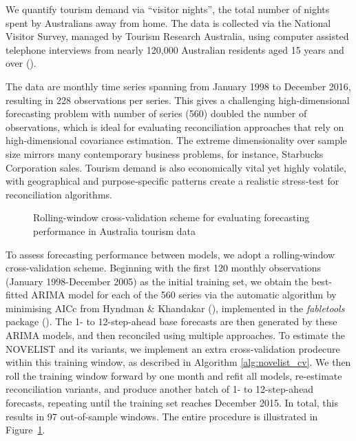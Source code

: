 \documentclass[
  11pt,
  letterpaper,
  DIV=11,
  numbers=noendperiod,
  titlepage]{scrartcl}
\begin{document}
We quantify tourism demand via ``visitor nights'', the total number of
nights spent by Australians away from home. The data is collected via
the National Visitor Survey, managed by Tourism Research Australia,
using computer assisted telephone interviews from nearly 120,000
Australian residents aged 15 years and over
().

The data are monthly time series spanning from January 1998 to December
2016, resulting in 228 observations per series. This gives a challenging
high-dimensional forecasting problem with number of series (560) doubled
the number of observations, which is ideal for evaluating reconciliation
approaches that rely on high-dimensional covariance estimation. The
extreme dimensionality over sample size mirrors many contemporary
business problems, for instance, Starbucks Corporation sales. Tourism
demand is also economically vital yet highly volatile, with geographical
and purpose‑specific patterns create a realistic stress‑test for
reconciliation algorithms.

\begin{figure}


\caption{\label{fig-tourism-cv}Rolling-window cross-validation scheme
for evaluating forecasting performance in Australia tourism data}

\end{figure}%

To assess forecasting performance between models, we adopt a
rolling-window cross-validation scheme. Beginning with the first 120
monthly observations (January 1998-December 2005) as the initial
training set, we obtain the best-fitted ARIMA model for each of the 560
series via the automatic algorithm by minimising AICc from Hyndman \&
Khandakar (), implemented in the
\emph{fabletools} package (). The 1- to 12-step-ahead base forecasts are then
generated by these ARIMA models, and then reconciled using multiple
approaches. To estimate the NOVELIST and its variants, we implement an
extra cross-validation prodecure within this training window, as
described in Algorithm \ref{alg:novelist_cv}. We then roll the training
window forward by one month and refit all models, re-estimate
reconciliation variants, and produce another batch of 1- to
12-step-ahead forecasts, repeating until the training set reaches
December 2015. In total, this results in 97 out-of-sample windows. The
entire procedure is illustrated in Figure~\ref{fig-tourism-cv}.
\end{document}
